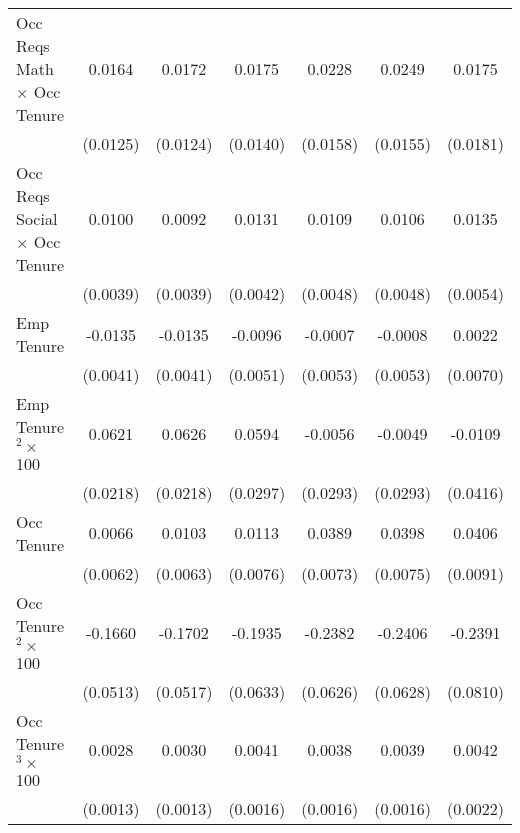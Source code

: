 {\begin{longtable}{l*{6}{c}}
Occ Reqs Math $\times$ Occ Tenure&      0.0164         &      0.0172         &      0.0175         &      0.0228         &      0.0249         &      0.0175         \\
                    &    (0.0125)         &    (0.0124)         &    (0.0140)         &    (0.0158)         &    (0.0155)         &    (0.0181)         \\
Occ Reqs Social $\times$ Occ Tenure&      0.0100\sym{**} &      0.0092\sym{**} &      0.0131\sym{***}&      0.0109\sym{**} &      0.0106\sym{**} &      0.0135\sym{**} \\
                    &    (0.0039)         &    (0.0039)         &    (0.0042)         &    (0.0048)         &    (0.0048)         &    (0.0054)         \\
Emp Tenure          &     -0.0135\sym{***}&     -0.0135\sym{***}&     -0.0096\sym{*}  &     -0.0007         &     -0.0008         &      0.0022         \\
                    &    (0.0041)         &    (0.0041)         &    (0.0051)         &    (0.0053)         &    (0.0053)         &    (0.0070)         \\
Emp Tenure$^2\times$ 100&      0.0621\sym{***}&      0.0626\sym{***}&      0.0594\sym{**} &     -0.0056         &     -0.0049         &     -0.0109         \\
                    &    (0.0218)         &    (0.0218)         &    (0.0297)         &    (0.0293)         &    (0.0293)         &    (0.0416)         \\
Occ Tenure          &      0.0066         &      0.0103         &      0.0113         &      0.0389\sym{***}&      0.0398\sym{***}&      0.0406\sym{***}\\
                    &    (0.0062)         &    (0.0063)         &    (0.0076)         &    (0.0073)         &    (0.0075)         &    (0.0091)         \\
Occ Tenure$^2\times$ 100&     -0.1660\sym{***}&     -0.1702\sym{***}&     -0.1935\sym{***}&     -0.2382\sym{***}&     -0.2406\sym{***}&     -0.2391\sym{***}\\
                    &    (0.0513)         &    (0.0517)         &    (0.0633)         &    (0.0626)         &    (0.0628)         &    (0.0810)         \\
Occ Tenure$^3\times$ 100&      0.0028\sym{**} &      0.0030\sym{**} &      0.0041\sym{**} &      0.0038\sym{**} &      0.0039\sym{**} &      0.0042\sym{*}  \\
                    &    (0.0013)         &    (0.0013)         &    (0.0016)         &    (0.0016)         &    (0.0016)         &    (0.0022)         \\

\end{longtable}}
